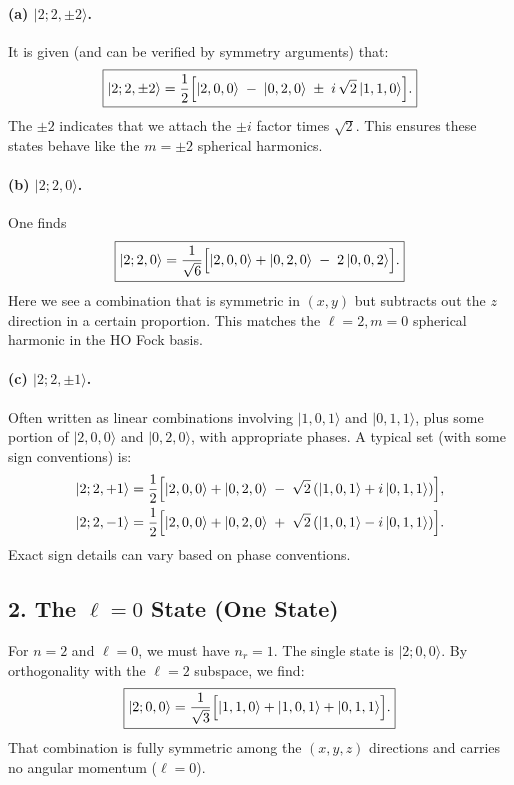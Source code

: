 \documentclass[12pt]{article}
\begin{document}
\paragraph{(a) $|2;2,\pm2\rangle$.}
It is given (and can be verified by symmetry arguments) that:
\[
\boxed{
|2;2,\pm 2\rangle
= \frac{1}{2}\Bigl[|2,0,0\rangle \;-\; |0,2,0\rangle \;\pm\; i\,\sqrt{2}\,|1,1,0\rangle\Bigr].
}
\]
The $\pm2$ indicates that we attach the $\pm i$ factor times $\sqrt{2}$. This ensures these states behave like the $m=\pm2$ spherical harmonics.

\paragraph{(b) $|2;2,0\rangle$.}
One finds
\[
\boxed{
|2;2,0\rangle = \frac{1}{\sqrt{6}}\Bigl[|2,0,0\rangle + |0,2,0\rangle \;-\; 2\,|0,0,2\rangle\Bigr].
}
\]
Here we see a combination that is symmetric in $(x,y)$ but subtracts out the $z$ direction in a certain proportion. This matches the $\ell=2,m=0$ spherical harmonic in the HO Fock basis.

\paragraph{(c) $|2;2,\pm1\rangle$.}
Often written as linear combinations involving $|1,0,1\rangle$ and $|0,1,1\rangle$, plus some portion of $|2,0,0\rangle$ and $|0,2,0\rangle$, with appropriate phases. A typical set (with some sign conventions) is:
\begin{align*}
|2;2,+1\rangle &= \frac{1}{2}\Bigl[|2,0,0\rangle + |0,2,0\rangle \;-\;\sqrt{2}\,(|1,0,1\rangle + i\,|0,1,1\rangle)\Bigr],\\
|2;2,-1\rangle &= \frac{1}{2}\Bigl[|2,0,0\rangle + |0,2,0\rangle \;+\;\sqrt{2}\,(|1,0,1\rangle - i\,|0,1,1\rangle)\Bigr].
\end{align*}
Exact sign details can vary based on phase conventions.

\subsection*{2. The $\ell=0$ State (One State)}
For $n=2$ and $\ell=0$, we must have $n_r=1$. The single state is $|2;0,0\rangle$. By orthogonality with the $\ell=2$ subspace, we find:
\[
\boxed{
|2;0,0\rangle
= \frac{1}{\sqrt{3}}\Bigl[|1,1,0\rangle + |1,0,1\rangle + |0,1,1\rangle\Bigr].
}
\]
That combination is fully symmetric among the $(x,y,z)$ directions and carries no angular momentum ($\ell=0$).
\end{document}
